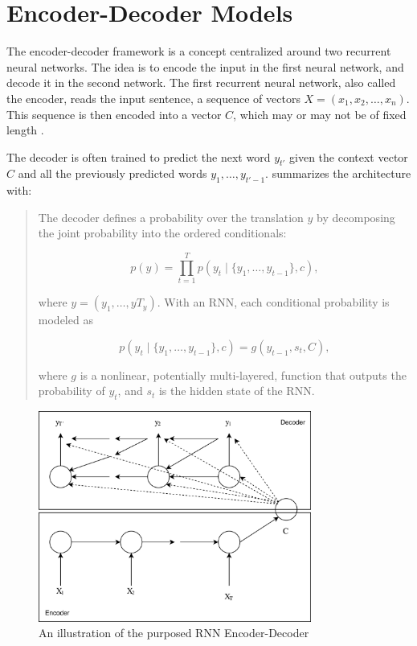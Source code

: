 
\section{Encoder-Decoder Models}
\label{sec:encoder-decoder}
The encoder-decoder framework is a concept centralized around two recurrent neural networks. The idea is to encode the input in the first neural network, and decode it in the second network. The first recurrent neural network, also called the encoder, reads the input sentence, a sequence of vectors \(X = (x_{1}, x_{2}, \ldots, x_{n})\). This sequence is then encoded into a vector \(C\), which may or may not be of fixed length \citep{sutskever2014sequence, cho2014learning}. 

The decoder is often trained to predict the next word \(y_{t'}\) given the context vector \(C\) and all the previously predicted words \({y_1, \ldots, y_{t'-1}}\). \cite{bahdanau2014neural} summarizes the architecture with:

\begin{quote}
    The decoder defines a probability over the translation \(y\) by decomposing the joint probability into the ordered conditionals:
    
    \begin{equation}
        p(y)=\prod_{t=1}^{T} p(y_t \mid \{y_1, \ldots, y_{t-1}\}, c),
    \end{equation}
    
    where \(y = (y_1, \ldots, yT_y)\). With an RNN, each conditional probability is modeled as
    
    \begin{equation}
        p(y_t \mid \{y_1, \ldots, y_{t-1} \}, c) = g(y_{t-1}, s_t, C),
    \end{equation}
    
    where \(g\) is a nonlinear, potentially multi-layered, function that outputs the probability of \(y_t\), and \(s_t\) is the hidden state of the RNN.
    
\end{quote}

\begin{figure}[ht]
    \centering
    \includegraphics[width=0.8\textwidth]{fig/background_theory/encoder-decoder.png}
    \caption{An illustration of the purposed RNN Encoder-Decoder}
    \label{fig:purposed-encoder-decoder}
\end{figure}

